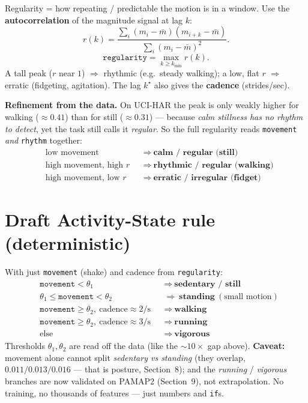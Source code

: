 \documentclass[11pt]{article}
\begin{document}
Regularity = how repeating / predictable the motion is in a window. Use the
\textbf{autocorrelation} of the magnitude signal at lag $k$:
\[
  r(k)=\frac{\sum_{i}(m_i-\bar m)(m_{i+k}-\bar m)}{\sum_{i}(m_i-\bar m)^2}.
\]
\[
  \texttt{regularity}=\max_{k\ge k_{\min}} r(k).
\]
A tall peak ($r$ near $1$) $\Rightarrow$ rhythmic (e.g.\ steady walking); a low, flat
$r$ $\Rightarrow$ erratic (fidgeting, agitation). The lag $k^\star$ also gives the
\textbf{cadence} (strides/sec).

\textbf{Refinement from the data.} On UCI-HAR the peak is only weakly higher for
walking ($\approx 0.41$) than for still ($\approx 0.31$) --- because \emph{calm
stillness has no rhythm to detect}, yet the task still calls it \emph{regular}. So the
full regularity reads \texttt{movement} \emph{and} \texttt{rhythm} together:
\[
\begin{aligned}
&\text{low movement}              &&\Rightarrow\ \textbf{calm / regular (still)}\\
&\text{high movement, high } r    &&\Rightarrow\ \textbf{rhythmic / regular (walking)}\\
&\text{high movement, low } r     &&\Rightarrow\ \textbf{erratic / irregular (fidget)}
\end{aligned}
\]

\section{Draft Activity-State rule (deterministic)}

With just \texttt{movement} (shake) and cadence from \texttt{regularity}:
\[
\begin{aligned}
&\texttt{movement} < \theta_1               &&\Rightarrow\ \textbf{sedentary / still}\\
&\theta_1 \le \texttt{movement} < \theta_2  &&\Rightarrow\ \textbf{standing} \ (\text{small motion})\\
&\texttt{movement} \ge \theta_2,\ \text{cadence}\approx 2/\text{s} &&\Rightarrow\ \textbf{walking}\\
&\texttt{movement} \ge \theta_2,\ \text{cadence}\approx 3/\text{s} &&\Rightarrow\ \textbf{running}\\
&\text{else} &&\Rightarrow\ \textbf{vigorous}
\end{aligned}
\]
Thresholds $\theta_1,\theta_2$ are read off the data (like the $\sim\!10\times$ gap above).
\textbf{Caveat:} movement alone cannot split \emph{sedentary vs standing} (they
overlap, $0.011/0.013/0.016$ --- that is posture, Section~8); and the \emph{running} /
\emph{vigorous} branches are now validated on PAMAP2 (Section~9), not extrapolation.
No training, no thousands of features --- just numbers and \texttt{if}s.
\end{document}
